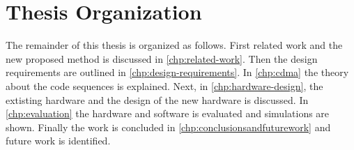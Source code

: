 
\section{Thesis Organization}

The remainder of this thesis is organized as follows.
First related work and the new proposed method is discussed in \autoref{chp:related-work}.
Then the design requirements are outlined in \autoref{chp:design-requirements}.
In \autoref{chp:cdma} the theory about the code sequences is explained.
Next, in \autoref{chp:hardware-design}, the extisting hardware and the design of the new hardware is discussed.
In \autoref{chp:evaluation} the hardware and software is evaluated and simulations are shown.
Finally the work is concluded in \autoref{chp:conclusionsandfuturework} and future work is identified.